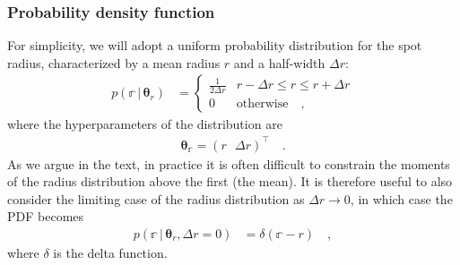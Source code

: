 \documentclass[modern]{aastex62}
\begin{document}
\subsubsection{Probability density function}
%
For simplicity, we will adopt a uniform probability distribution for the
spot radius, characterized by a mean radius $r$ and a half-width $\Delta r$:
%
\begin{align}
    p(\mathbb{r} \, \big| \, \pmb{\theta}_{r})
     & =
    \begin{cases}
        \frac{1}{2\Delta r} & r - \Delta r \leq r \leq r + \Delta r
        \\
        0                   & \mathrm{otherwise}
        \quad,
    \end{cases}
\end{align}
%
where the hyperparameters of the distribution are
%
\begin{align}
    \pmb{\theta}_\mathbb{r} = \left(
    r \, \, \, \,
    \Delta r \right)^\top
    \quad.
\end{align}
%
As we argue in the text, in practice it is often difficult to constrain the
moments of the radius distribution above the first (the mean). It is
therefore useful to also consider the limiting case of the radius distribution
as $\Delta r \rightarrow 0$, in which case the PDF becomes
%
\begin{align}
    p(\mathbb{r} \, \big| \, \pmb{\theta}_{r}, \Delta r = 0)
     & =
    \delta(\mathbb{r} - r)
    \quad,
\end{align}
%
where $\delta$ is the delta function.
%
\end{document}
